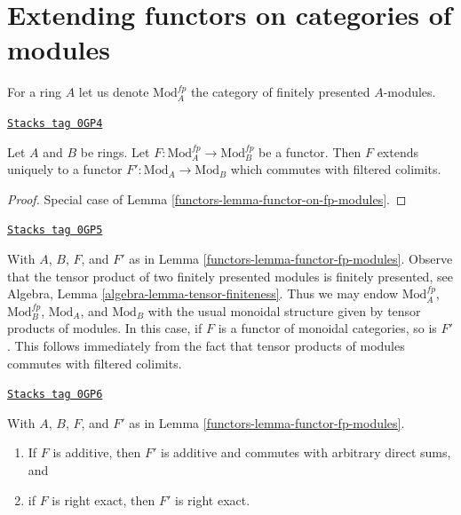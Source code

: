 \section{Extending functors on categories of modules}
\label{functors-section-functors-extend}
For a ring $A$ let us denote $\text{Mod}^{fp}_A$ the category of
finitely presented $A$-modules.

\begin{lemma}
\label{functors-lemma-functor-fp-modules}
\href{https://stacks.math.columbia.edu/tag/0GP4}{\texttt{Stacks tag 0GP4}}

Let $A$ and $B$ be rings. Let
$F : \text{Mod}^{fp}_A \to \text{Mod}^{fp}_B$ be a functor.
Then $F$ extends uniquely to a functor
$F' : \text{Mod}_A \to \text{Mod}_B$
which commutes with filtered colimits.
\end{lemma}

\begin{proof}

Special case of Lemma \ref{functors-lemma-functor-on-fp-modules}.
\end{proof}

\begin{remark}
\label{functors-remark-monoidal-extension}
\href{https://stacks.math.columbia.edu/tag/0GP5}{\texttt{Stacks tag 0GP5}}

With $A$, $B$, $F$, and $F'$ as in Lemma \ref{functors-lemma-functor-fp-modules}.
Observe that the tensor product of two finitely presented modules is
finitely presented, see Algebra, Lemma \ref{algebra-lemma-tensor-finiteness}.
Thus we may endow $\text{Mod}^{fp}_A$, $\text{Mod}^{fp}_B$,
$\text{Mod}_A$, and $\text{Mod}_B$ with the usual monoidal structure
given by tensor products of modules. In this case, if $F$ is
a functor of monoidal categories, so is $F'$. This follows immediately
from the fact that tensor products of modules commutes with filtered
colimits.
\end{remark}

\begin{lemma}
\label{functors-lemma-functor-fp-modules-exact}
\href{https://stacks.math.columbia.edu/tag/0GP6}{\texttt{Stacks tag 0GP6}}

With $A$, $B$, $F$, and $F'$ as in Lemma \ref{functors-lemma-functor-fp-modules}.
\begin{enumerate}
\item If $F$ is additive, then $F'$ is additive and
commutes with arbitrary direct sums, and
\item if $F$ is right exact, then $F'$ is right exact.
\end{enumerate}
\end{lemma}

